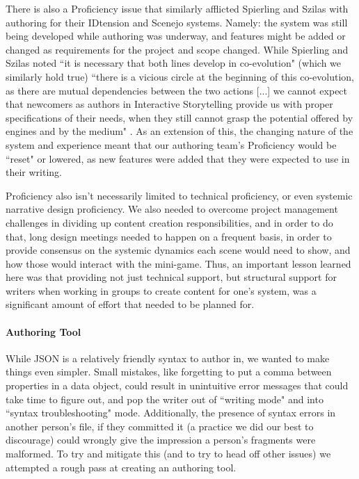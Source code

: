 There is also a Proficiency issue that similarly afflicted Spierling and Szilas with authoring for their IDtension and Scenejo systems. Namely: the system was still being developed while authoring was underway, and features might be added or changed as requirements for the project and scope changed. While Spierling and Szilas noted ``it is necessary that both lines develop in co-evolution" (which we similarly hold true) ``there is a vicious circle at the beginning of this co-evolution, as there are mutual dependencies between the two actions [...] we cannot expect that newcomers as authors in Interactive Storytelling provide us with proper specifications of their needs, when they still cannot grasp the potential offered by engines and by the medium" \cite{authoring_issues}. As an extension of this, the changing nature of the system and experience meant that our authoring team's Proficiency would be ``reset" or lowered, as new features were added that they were expected to use in their writing.

Proficiency also isn't necessarily limited to technical proficiency, or even systemic narrative design proficiency. We also needed to overcome project management challenges in dividing up content creation responsibilities, and in order to do that, long design meetings needed to happen on a frequent basis, in order to provide consensus on the systemic dynamics each scene would need to show, and how those would interact with the mini-game. Thus, an important lesson learned here was that providing not just technical support, but structural support for writers when working in groups to create content for one's system, was a significant amount of effort that needed to be planned for.

\paragraph{Authoring Tool}

While JSON is a relatively friendly syntax to author in, we wanted to make things even simpler. Small mistakes, like forgetting to put a comma between properties in a data object, could result in unintuitive error messages that could take time to figure out, and pop the writer out of ``writing mode" and into ``syntax troubleshooting" mode. Additionally, the presence of syntax errors in another person's file, if they committed it (a practice we did our best to discourage) could wrongly give the impression a person's fragments were malformed. To try and mitigate this (and to try to head off other issues) we attempted a rough pass at creating an authoring tool.


